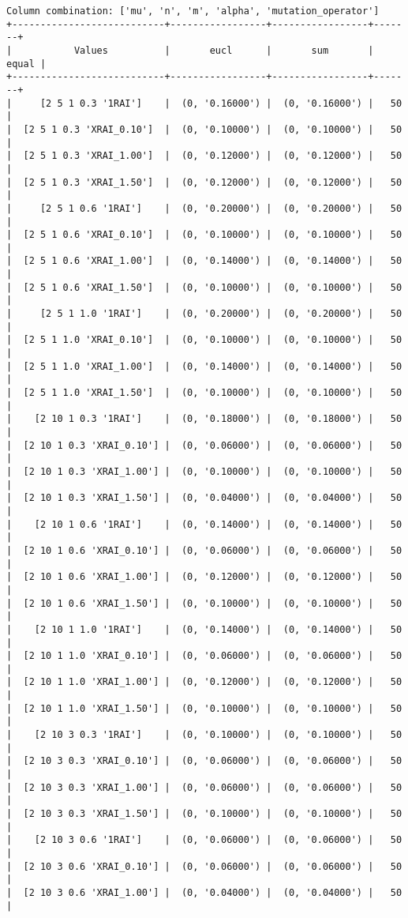 \documentclass{article}
\begin{document}
\begin{verbatim}
Column combination: ['mu', 'n', 'm', 'alpha', 'mutation_operator']
+---------------------------+-----------------+-----------------+-------+
|           Values          |       eucl      |       sum       | equal |
+---------------------------+-----------------+-----------------+-------+
|     [2 5 1 0.3 '1RAI']    |  (0, '0.16000') |  (0, '0.16000') |   50  |
|  [2 5 1 0.3 'XRAI_0.10']  |  (0, '0.10000') |  (0, '0.10000') |   50  |
|  [2 5 1 0.3 'XRAI_1.00']  |  (0, '0.12000') |  (0, '0.12000') |   50  |
|  [2 5 1 0.3 'XRAI_1.50']  |  (0, '0.12000') |  (0, '0.12000') |   50  |
|     [2 5 1 0.6 '1RAI']    |  (0, '0.20000') |  (0, '0.20000') |   50  |
|  [2 5 1 0.6 'XRAI_0.10']  |  (0, '0.10000') |  (0, '0.10000') |   50  |
|  [2 5 1 0.6 'XRAI_1.00']  |  (0, '0.14000') |  (0, '0.14000') |   50  |
|  [2 5 1 0.6 'XRAI_1.50']  |  (0, '0.10000') |  (0, '0.10000') |   50  |
|     [2 5 1 1.0 '1RAI']    |  (0, '0.20000') |  (0, '0.20000') |   50  |
|  [2 5 1 1.0 'XRAI_0.10']  |  (0, '0.10000') |  (0, '0.10000') |   50  |
|  [2 5 1 1.0 'XRAI_1.00']  |  (0, '0.14000') |  (0, '0.14000') |   50  |
|  [2 5 1 1.0 'XRAI_1.50']  |  (0, '0.10000') |  (0, '0.10000') |   50  |
|    [2 10 1 0.3 '1RAI']    |  (0, '0.18000') |  (0, '0.18000') |   50  |
|  [2 10 1 0.3 'XRAI_0.10'] |  (0, '0.06000') |  (0, '0.06000') |   50  |
|  [2 10 1 0.3 'XRAI_1.00'] |  (0, '0.10000') |  (0, '0.10000') |   50  |
|  [2 10 1 0.3 'XRAI_1.50'] |  (0, '0.04000') |  (0, '0.04000') |   50  |
|    [2 10 1 0.6 '1RAI']    |  (0, '0.14000') |  (0, '0.14000') |   50  |
|  [2 10 1 0.6 'XRAI_0.10'] |  (0, '0.06000') |  (0, '0.06000') |   50  |
|  [2 10 1 0.6 'XRAI_1.00'] |  (0, '0.12000') |  (0, '0.12000') |   50  |
|  [2 10 1 0.6 'XRAI_1.50'] |  (0, '0.10000') |  (0, '0.10000') |   50  |
|    [2 10 1 1.0 '1RAI']    |  (0, '0.14000') |  (0, '0.14000') |   50  |
|  [2 10 1 1.0 'XRAI_0.10'] |  (0, '0.06000') |  (0, '0.06000') |   50  |
|  [2 10 1 1.0 'XRAI_1.00'] |  (0, '0.12000') |  (0, '0.12000') |   50  |
|  [2 10 1 1.0 'XRAI_1.50'] |  (0, '0.10000') |  (0, '0.10000') |   50  |
|    [2 10 3 0.3 '1RAI']    |  (0, '0.10000') |  (0, '0.10000') |   50  |
|  [2 10 3 0.3 'XRAI_0.10'] |  (0, '0.06000') |  (0, '0.06000') |   50  |
|  [2 10 3 0.3 'XRAI_1.00'] |  (0, '0.06000') |  (0, '0.06000') |   50  |
|  [2 10 3 0.3 'XRAI_1.50'] |  (0, '0.10000') |  (0, '0.10000') |   50  |
|    [2 10 3 0.6 '1RAI']    |  (0, '0.06000') |  (0, '0.06000') |   50  |
|  [2 10 3 0.6 'XRAI_0.10'] |  (0, '0.06000') |  (0, '0.06000') |   50  |
|  [2 10 3 0.6 'XRAI_1.00'] |  (0, '0.04000') |  (0, '0.04000') |   50  |

\end{verbatim}
\end{document}
